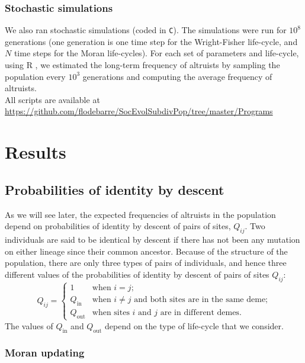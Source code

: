 \documentclass[11pt, letterpaper]{article}
\newcommand{\inn}{\textrm{in}}
\newcommand{\out}{\textrm{out}}
\newcommand{\Qin}{Q_{\inn}}
\newcommand{\Qout}{Q_{\out}}
\begin{document}
\subsubsection{Stochastic simulations}
We also ran stochastic simulations (coded in \texttt{C}). The simulations were run for $10^8$ generations (one generation is one time step for the Wright-Fisher life-cycle, and $N$ time steps for the Moran life-cycles). For each set of parameters and life-cycle, using R \citep{R2015}, we estimated the long-term frequency of altruists by sampling the population every $10^3$ generations and computing the average frequency of altruists.\\
%
All scripts are available at \\
{\small \url{https://github.com/flodebarre/SocEvolSubdivPop/tree/master/Programs}} 

\section{Results}

\subsection{Probabilities of identity by descent}

As we will see later, the expected frequencies of altruists in the population depend on probabilities of identity by descent of pairs of sites, $Q_{ij}$. Two individuals are said to be identical by descent if there has not been any mutation on either lineage since their common ancestor.  Because of the structure of the population, there are only three types of pairs of individuals, and hence three different values of the probabilities of identity by descent of pairs of sites $Q_{ij}$:
\begin{equation}
Q_{ij} = 
\begin{cases}
1 & \textrm{when $i=j$;}\\
%
\Qin & \textrm{when $i\neq j$ and both sites are in the same deme;}\\
%
\Qout & \textrm{when sites $i$ and $j$ are in different demes.}
\end{cases}
\end{equation}
The values of $\Qin$ and $\Qout$ depend on the type of life-cycle that we consider. 

\subsubsection{Moran updating} 
\end{document}
